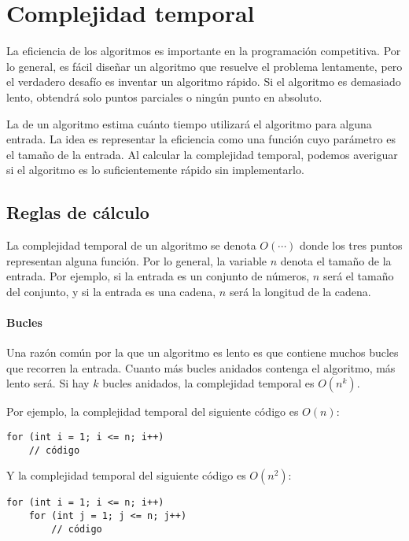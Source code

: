 \chapter{Complejidad temporal}


La eficiencia de los algoritmos es importante en la programación competitiva.
Por lo general, es fácil diseñar un algoritmo
que resuelve el problema lentamente,
pero el verdadero desafío es inventar un
algoritmo rápido.
Si el algoritmo es demasiado lento, obtendrá solo
puntos parciales o ningún punto en absoluto.

La  de un algoritmo
estima cuánto tiempo utilizará el algoritmo
para alguna entrada.
La idea es representar la eficiencia
como una función cuyo parámetro es el tamaño de la entrada.
Al calcular la complejidad temporal,
podemos averiguar si el algoritmo es lo suficientemente rápido
sin implementarlo.

\section{Reglas de cálculo}

La complejidad temporal de un algoritmo
se denota $O(\cdots)$
donde los tres puntos representan alguna
función.
Por lo general, la variable $n$ denota
el tamaño de la entrada.
Por ejemplo, si la entrada es un conjunto de números,
$n$ será el tamaño del conjunto,
y si la entrada es una cadena,
$n$ será la longitud de la cadena.

\subsubsection*{Bucles}

Una razón común por la que un algoritmo es lento es
que contiene muchos bucles que recorren la entrada.
Cuanto más bucles anidados contenga el algoritmo,
más lento será.
Si hay $k$ bucles anidados,
la complejidad temporal es $O(n^k)$.

Por ejemplo, la complejidad temporal del siguiente código es $O(n)$:
\begin{lstlisting}
for (int i = 1; i <= n; i++)
    // código
\end{lstlisting}

Y la complejidad temporal del siguiente código es $O(n^2)$:
\begin{lstlisting}
for (int i = 1; i <= n; i++)
    for (int j = 1; j <= n; j++)
        // código
\end{lstlisting}

